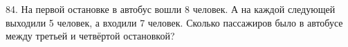 84. На первой остановке в автобус вошли 8 человек. А на каждой следующей выходили 5 человек, а входили 7 человек. Сколько пассажиров было в  автобусе между третьей и четвёртой остановкой?\\
